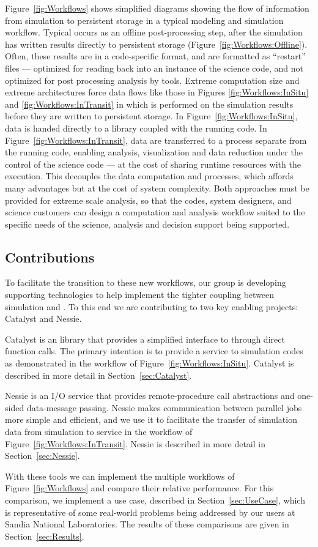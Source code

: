 Figure~\ref{fig:Workflows} shows simplified diagrams showing the flow of
information from simulation to persistent storage in a typical modeling and
simulation workflow.  Typical \vda occurs as an offline post-processing
step, after the simulation has written results directly to persistent
storage (Figure~\ref{fig:Workflows:Offline}).  Often, these results are in
a code-specific format, and are formatted as ``restart'' files ---
optimized for reading back into an instance of the science code, and not
optimized for post processing analysis by \vda tools.  Extreme computation
size and extreme architectures force data flows like those in Figures
\ref{fig:Workflows:InSitu} and \ref{fig:Workflows:InTransit} in which \vda
is performed on the simulation results before they are written to
persistent storage.  In Figure~\ref{fig:Workflows:InSitu}, data is handed
directly to a \vda library coupled with the running code.  In
Figure~\ref{fig:Workflows:InTransit}, data are transferred to a \vda
process separate from the running code, enabling analysis, visualization
and data reduction under the control of the science code --- at the cost of
sharing runtime resources with the \vda execution.  This decouples the data
computation and \vda processes, which affords many advantages but at the
cost of system complexity.  Both approaches must be provided for extreme
scale analysis, so that the codes, system designers, and science customers
can design a computation and analysis workflow suited to the specific needs
of the science, analysis and decision support being supported.

\subsection{Contributions}

To facilitate the transition to these new workflows, our group is
developing supporting technologies to help implement the tighter coupling
between simulation and \vda.  To this end we are contributing to two key
enabling projects: Catalyst and Nessie.

Catalyst is an \insitu library that provides a simplified interface to \vda
through direct function calls.  The primary intention is to provide a \vda
service to simulation codes as demonstrated in the workflow of
Figure~\ref{fig:Workflows:InSitu}.  Catalyst is described in more detail in
Section~\ref{sec:Catalyst}.

Nessie is an I/O service that provides remote-procedure call abstractions
and one-sided data-message passing.  Nessie makes communication between
parallel jobs more simple and efficient, and we use it to facilitate the
transfer of simulation data from simulation to \vda service in the
\intransit workflow of Figure~\ref{fig:Workflows:InTransit}.  Nessie is
described in more detail in Section~\ref{sec:Nessie}.

With these tools we can implement the multiple workflows of
Figure~\ref{fig:Workflows} and compare their relative performance.  For
this comparison, we implement a use case, described in
Section~\ref{sec:UseCase}, which is representative of some real-world
problems being addressed by our users at Sandia National Laboratories.  The
results of these comparisons are given in Section~\ref{sec:Results}.
